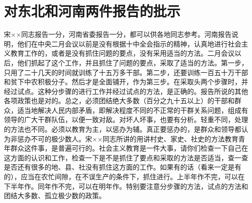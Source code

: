 \section[对东北和河南两件报告的批示（一九六三年五月八日）]{对东北和河南两件报告的批示}


宋××同志报告一分，河南省委报告一分，都可以供各地同志参考。河南报告说明，他们在中央二月会议以前是没有根据十中全会指示的精神，认真地进行社会主义教育工作的，或者是没有抓住问题的要点，没有采用适当的方法。二月会议以后，他们抓起了这个工作，并且抓住了问题的要点，采取了适当的方法。第一步，只用了二十几天的时间就训练了十五万多干部。第二步，还要训练一百五十万干部和贫下中农积极分子。然后才是全面铺开，作为第三步。在采取头两个步骤时，并经过试点。这种分步骤的进行工作并经过试点的方法，是正确的。报告所说的其他各项政策也是对的。总之，必须团结绝大多数（百分之九十五以上）的干部和群众，适当地解决人民内部矛盾，即解决程度不同的不正常的干群关系问题，组成有领导的广大干群队伍，以便一致对敌。对坏人坏事，也要有分析。轻重不同，处理的方法也不同。必须以教育为主，以惩办为辅。真正要惩办的，是群众和领导都认为非惩办不可的极少数人。宋××同志所讲的用讲村史、家史、社史的方法教育青年群众这件事，是普遍可行的。社会主义教育是一件大事，请你们检查一下自己在这方面的认识和工作，检查一下是不是抓住了要点和采取的方法是否适当，查一查是否还有很多的地、县、社没有抓住这方面的工作。如果有的话（看来一定是有的），应当在农忙间隙，在不误生产的条件下，抓住进行。上半年作不完，可以在下半年作。同年作不完，可以在明年作。特别要注意分步骤的方法，试点的方法和团结大多数、孤立极少数的政策。

